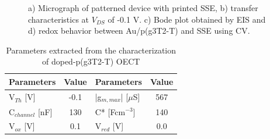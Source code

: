 \begin{figure}[ht]
    \centering
    \qquad
    \caption[Performance of solid-OECT with doped-p(g3T2-T)]{a) Micrograph of patterned device with printed SSE, b) transfer characteristics at $V_{DS}$ of -0.1 V. c) Bode plot obtained by EIS and d) redox behavior between Au/p(g3T2-T) and SSE using CV.}
    \label{fig:dopedSSE}
\end{figure}

\begin{table}[ht]
\centering
\caption{Parameters extracted from the characterization of doped-p(g3T2-T) OECT}
\begin{tabular}{l|c||l|c}
Parameters & Value & Parameters & Value \\\hline \hline
V$_{Th}$ [V] & -0.1 & |g$_{m,max}$| [$\mu$S] & 567 \\
C$_{channel}$ [nF] & 130 & C* [Fcm$^{-3}$] &  140 \\
V$_{ox}$ [V] & 0.1 & V$_{red}$ [V] & 0.0 \\\hline
\end{tabular}
\label{tab:dopedfom}
\end{table}

